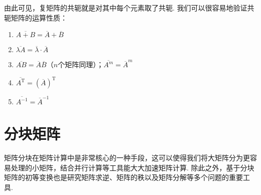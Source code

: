 由此可见，复矩阵的共轭就是对其中每个元素取了共轭. 我们可以很容易地验证共轭矩阵的运算性质：
\begin{enumerate}
    \item $\overline{A+B}=\overline{A}+\overline{B}$

    \item $\overline{\lambda A}=\overline{\lambda} \cdot \overline{A}$

    \item $\overline{AB}=\overline{A}\overline{B}$（$n$个矩阵同理）；$\overline{A^m}=\overline{A}^m$

    \item $\overline{A^\mathrm{T}}=(\overline{A})^\mathrm{T}$

    \item $\overline{A^{-1}}=\overline{A}^{-1}$
\end{enumerate}

\section{分块矩阵} \label{sec:分块矩阵}

矩阵分块在矩阵计算中是非常核心的一种手段，这可以使得我们将大矩阵分为更容易处理的小矩阵，结合并行计算等工具能大大加速矩阵计算. 除此之外，基于分块矩阵的初等变换也是研究矩阵求逆、矩阵的秩以及矩阵分解等多个问题的重要工具.

